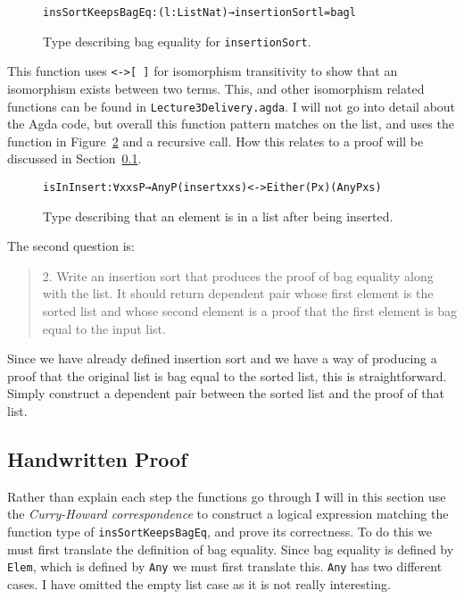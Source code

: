 \documentclass[oribibl, fleqn]{llncs}
\begin{document}
\begin{figure}
\begin{alltt}
insSortKeepsBagEq : (l : List Nat) → insertionSort l =bag l 
\end{alltt}
\caption{Type describing bag equality for \texttt{insertionSort}.}
\label{fig:Proof_Proposition}
\end{figure}

This function uses \texttt{<->[ ]} for isomorphism transitivity to show that an isomorphism exists between two terms. This, and other isomorphism related functions can be found in \texttt{Lecture3Delivery.agda}. I will not go into detail about the Agda code, but overall this function pattern matches on the list, and uses the function in Figure~\ref{fig:lemmafunction} and a recursive call. How this relates to a proof will be discussed in Section~\ref{sec:proof}.

\begin{figure}
\begin{alltt}
isInInsert : ∀ {x xs P} → Any P (insert x xs) <-> Either (P x) (Any P xs)

\end{alltt}
\caption{Type describing that an element is in a list after being inserted.}
\label{fig:lemmafunction}
\end{figure}

The second question is:

\begin{quote}
2. Write an insertion sort that produces the proof of bag equality along with the list. It should return dependent pair whose first element is the sorted list and whose second element is a proof that the first element is bag equal to the input list.
\end{quote}

Since we have already defined insertion sort and we have a way of producing a proof that the original list is bag equal to the sorted list, this is straightforward. Simply construct a dependent pair between the sorted list and the proof of that list.

\subsection{Handwritten Proof}
\label{sec:proof}
Rather than explain each step the functions go through I will in this section use the \emph{Curry-Howard correspondence} to construct a logical expression matching the function type of \texttt{insSortKeepsBagEq}, and prove its correctness. 
To do this we must first translate the definition of bag equality. Since bag equality is defined by \texttt{Elem}, which is defined by \texttt{Any} we must first translate this. \texttt{Any} has two different cases. I have omitted the empty list case as it is not really interesting.
\end{document}
